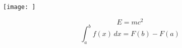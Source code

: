 \documentclass[12pt, a4paper]{article}
\begin{document}
\begin{center}
\texttt{[image: ]}
\label{fig:mpr}
\end{center}


\showsolution

\begin{solution}
\[
E = mc^2
\]
\[
\int_a^b f(x) \, dx = F(b) - F(a)
\]
\end{solution}
\end{document}
